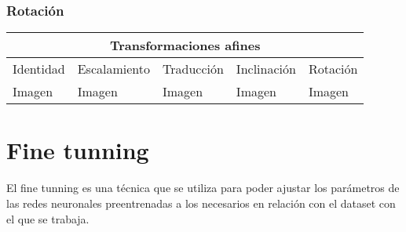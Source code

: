 \subsubsection{Rotación}

\begin{tabular}{ |p{2.5cm}|p{2.5cm}|p{2.5cm}|p{2.5cm}|p{2.5cm}|  }
	\hline
	\multicolumn{5}{|c|}{Transformaciones afines}\\ 
	\hline
	Identidad & Escalamiento & Traducción & Inclinación & Rotación\\
	\hline
	Imagen   & Imagen    &Imagen&   Imagen &   Imagen\\
	\hline
   \end{tabular}

\section{Fine tunning}
   El fine tunning es una técnica que se utiliza para poder ajustar los parámetros de las redes neuronales preentrenadas a los necesarios en relación con
   el dataset con el que se trabaja.
